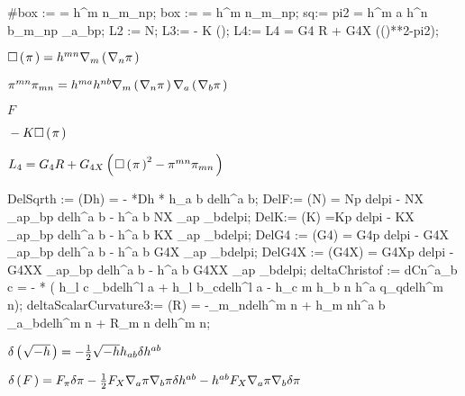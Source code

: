 \documentclass[10pt]{article}
\newcommand\brwrap[3]{%
  \setbox0=\hbox{$#2$}
  \left#1\vbox to \the\ht0{\hbox to 0pt{}}\right.\kern-.2em
  \begingroup #2\endgroup\kern-.15em
  \left.\vbox to \the\ht0{\hbox to 0pt{}}\right#3
}
\begin{document}
\begin{python}
#box :=  = h^{m n}\nabla_{m}{\nabla_{n}{p}};
box :=  = h^{m n}\nabla_{m}{\nabla_{n}{p}};
sq:= pi2 = h^{m a} h^{n b}\nabla_{m}{\nabla_{n}{p}} \nabla_{a}{\nabla_{b}{p}};
L2 := N;
L3:= - K ();
L4:= L4 = G4 R + G4X (()**2-pi2);
\end{python}
\begin{adjustwidth}{1em}{0cm}${}\Box\brwrap{(}{\pi}{)} = h^{m n} \nabla_{m}\brwrap{(}{\nabla_{n}{\pi}}{)}$\end{adjustwidth}
\begin{adjustwidth}{1em}{0cm}${}\pi^{m n}\pi_{m n} = h^{m a} h^{n b} \nabla_{m}\brwrap{(}{\nabla_{n}{\pi}}{)} \nabla_{a}\brwrap{(}{\nabla_{b}{\pi}}{)}$\end{adjustwidth}
\begin{adjustwidth}{1em}{0cm}${}F$\end{adjustwidth}
\begin{adjustwidth}{1em}{0cm}${}-K \Box\brwrap{(}{\pi}{)}$\end{adjustwidth}
\begin{adjustwidth}{1em}{0cm}${}{L_{4}} = {G_{4}} R+G_{4X} \brwrap{(}{{\Box\brwrap{(}{\pi}{)}}^{2}-\pi^{m n}\pi_{m n}}{)}$\end{adjustwidth}
\begin{python}
DelSqrth := \delta(Dh) = - *Dh * h_{a b} delh^{a b};
DelF:= \delta(N) = Np delpi -  NX \nabla_{a}{p}\nabla_{b}{p}  delh^{a b} - h^{a b} NX \nabla_{a}{p} \nabla_{b}{delpi}; 
DelK:= \delta(K) =Kp delpi -  KX \nabla_{a}{p}\nabla_{b}{p}  delh^{a b} - h^{a b} KX \nabla_{a}{p} \nabla_{b}{delpi}; 
DelG4 := \delta(G4) = G4p delpi -  G4X \nabla_{a}{p}\nabla_{b}{p}  delh^{a b} - h^{a b} G4X \nabla_{a}{p} \nabla_{b}{delpi};
DelG4X := \delta(G4X) = G4Xp delpi -  G4XX \nabla_{a}{p}\nabla_{b}{p}  delh^{a b} - h^{a b} G4XX \nabla_{a}{p} \nabla_{b}{delpi};
deltaChristof := dCn^{a}_{b c} = - * ( h_{l c} \nabla_{b}{delh^{l a}} +  h_{l b}\nabla_{c}{delh^{l a}} - h_{c m} h_{b n} h^{a q}\nabla_{q}{delh^{m n}});
deltaScalarCurvature3:= \delta(R) = -\nabla_{m}{\nabla_{n}{delh^{m n}}} + h_{m n}h^{a b} \nabla_{a}{\nabla_{b}{delh^{m n}}} + R_{m n} delh^{m n};
\end{python}
\begin{adjustwidth}{1em}{0cm}${}\delta\brwrap{(}{\sqrt{-h}}{)} =  - \frac{1}{2}\sqrt{-h} h_{a b} \delta h^{a b}$\end{adjustwidth}
\begin{adjustwidth}{1em}{0cm}${}\delta\brwrap{(}{F}{)} = F_{\pi} \delta\pi - \frac{1}{2}F_{X} \nabla_{a}{\pi} \nabla_{b}{\pi} \delta h^{a b}-h^{a b} F_{X} \nabla_{a}{\pi} \nabla_{b}{\delta\pi}$\end{adjustwidth}
\end{document}
